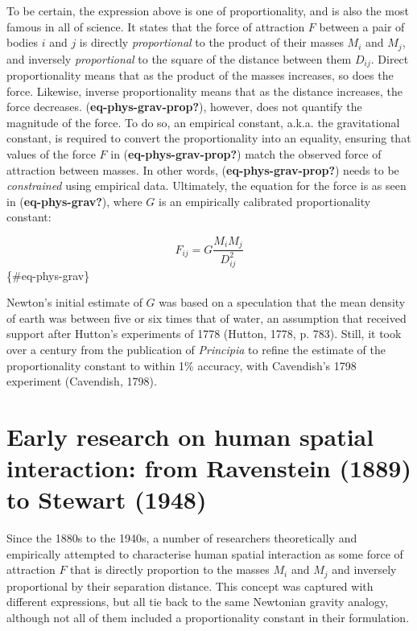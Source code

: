 \documentclass[
11pt, %
oneside, %
english, %
singlespacing, %
]{macthesis} %
\begin{document}
To be certain, the expression above is one of proportionality, and is also the most famous in all of science. It states that the force of attraction \(F\) between a pair of bodies \(i\) and \(j\) is directly \emph{proportional} to the product of their masses \(M_i\) and \(M_j\), and inversely \emph{proportional} to the square of the distance between them \(D_{ij}\). Direct proportionality means that as the product of the masses increases, so does the force. Likewise, inverse proportionality means that as the distance increases, the force decreases. (\textbf{eq-phys-grav-prop?}), however, does not quantify the magnitude of the force. To do so, an empirical constant, a.k.a. the gravitational constant, is required to convert the proportionality into an equality, ensuring that values of the force \(F\) in (\textbf{eq-phys-grav-prop?}) match the observed force of attraction between masses. In other words, (\textbf{eq-phys-grav-prop?}) needs to be \emph{constrained} using empirical data. Ultimately, the equation for the force is as seen in (\textbf{eq-phys-grav?}), where \(G\) is an empirically calibrated proportionality constant:

\[
F_{ij} = G \frac{M_i M_j} {D_{ij}^{2}}
\] \{\#eq-phys-grav\}

Newton's initial estimate of \(G\) was based on a speculation that the mean density of earth was between five or six times that of water, an assumption that received support after Hutton's experiments of 1778 (Hutton, 1778, p. 783). Still, it took over a century from the publication of \emph{Principia} to refine the estimate of the proportionality constant to within 1\% accuracy, with Cavendish's 1798 experiment (Cavendish, 1798).

\section{Early research on human spatial interaction: from Ravenstein (1889) to Stewart (1948)}\label{early-research-on-human-spatial-interaction-from-ravenstein-1889-to-stewart-1948}

Since the 1880s to the 1940s, a number of researchers theoretically and empirically attempted to characterise human spatial interaction as some force of attraction \(F\) that is directly proportion to the masses \(M_i\) and \(M_j\) and inversely proportional by their separation distance. This concept was captured with different expressions, but all tie back to the same Newtonian gravity analogy, although not all of them included a proportionality constant in their formulation.
\end{document}
